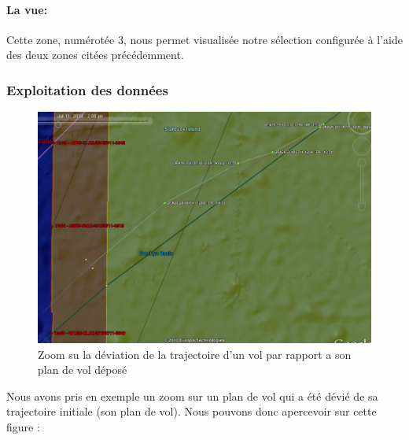             \paragraph{La vue:}
Cette zone, numérotée 3, nous permet visualisée notre sélection configurée à l'aide des deux zones citées précédemment.

        \subsubsection{Exploitation des données}
\begin{figure}[!h]
\center
\includegraphics[width=12cm]{images/gezoom.png}
\caption{Zoom su la déviation de la trajectoire d'un vol par rapport a son plan de vol déposé}
\label{gezoom}
\end{figure}
Nous avons pris en exemple un zoom sur un plan de vol qui a été dévié de sa trajectoire initiale (son plan de vol).
Nous pouvons donc apercevoir sur cette figure :
